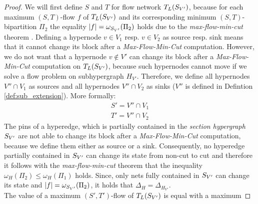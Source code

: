 \begin{proof}
We will first define $S$ and $T$ for flow network
$T_L(S_{V'})$, because for each maximum $(S,T)$-flow $f$ of $T_L(S_{V'})$
and its corresponding minimum $(S,T)$-bipartition $\Pi_2$ the equality 
$|f| = \omega_{S_{V'}}(\Pi_2)$ holds due to the 
\emph{max-flow-min-cut} theorem \cite{ford1956maximal}. 
Defining a hypernode $v \in V_1$ resp. $v \in V_2$ as source resp. sink means that
it cannot change its block after a \emph{Max-Flow-Min-Cut} computation.
However, we do not want that a hypernode $v \notin V'$ can change its block after
a \emph{Max-Flow-Min-Cut} computation on $T_L(S_{V'})$, because such hypernodes
cannot move if we solve a flow problem on subhypergraph $H_{V'}$. Therefore, we define
all hypernodes $V'' \cap V_1$ as sources and all hypernodes $V'' \cap V_2$ as sinks 
($V''$ is defined in Defintion \ref{def:sub_extension}). More formally:
\begin{align*}
S' = V'' \cap V_1 \\
T' = V'' \cap V_2 
\end{align*}
The pins of a hyperedge, which is partially contained in the \emph{section hypergraph}
$S_{V'}$ are not able to change its block after a \emph{Max-Flow-Min-Cut}
computation, because we define them either as source or a sink. Consequently, 
no hyperedge partially contained in $S_{V'}$ can change its state 
from non-cut to cut and therefore it follows with the \emph{max-flow-min-cut} 
theorem \cite{ford1956maximal} that the inequality $\omega_H(\Pi_2) \le \omega_H(\Pi_1)$
holds. Since, only nets fully contained in $S_{V'}$ can change its state and
$|f| = \omega_{S_{V'}}(\Pi_2)$, it holds that
$\Delta_H = \Delta_{H_{V'}}$. \\
The value of a maximum $(S',T')$-flow of $T_L(S_{V'})$ is equal with a maximum

\end{proof}
